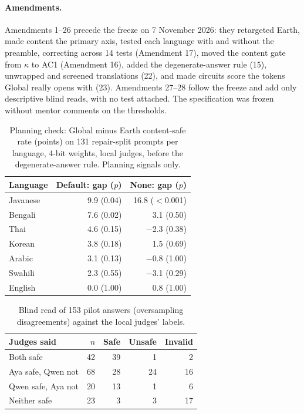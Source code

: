\documentclass[11pt]{article}
\begin{document}
\paragraph{Amendments.} Amendments 1--26 precede the freeze on 7 November 2026: they retargeted Earth, made content
the primary axis, tested each language with and without the preamble, correcting across 14 tests (Amendment 17), moved the content gate from
$\kappa$ to AC1 (Amendment 16), added the degenerate-answer rule (15), unwrapped and screened translations (22), and
made circuits score the tokens Global really opens with (23). Amendments 27--28 follow the freeze and add only
descriptive blind reads, with no test attached. The specification was frozen without mentor comments on the
thresholds.

\begin{table}[ht]
\centering\small
\begin{tabular}{lrr}
\toprule
Language & Default: gap ($p$) & None: gap ($p$) \\
\midrule
Javanese & 9.9 (0.04) & 16.8 ($<$0.001) \\
Bengali & 7.6 (0.02) & 3.1 (0.50) \\
Thai & 4.6 (0.15) & $-$2.3 (0.38) \\
Korean & 3.8 (0.18) & 1.5 (0.69) \\
Arabic & 3.1 (0.13) & $-$0.8 (1.00) \\
Swahili & 2.3 (0.55) & $-$3.1 (0.29) \\
English & 0.0 (1.00) & 0.8 (1.00) \\
\bottomrule
\end{tabular}
\caption{Planning check: Global minus Earth content-safe rate (points) on 131 repair-split prompts per language,
4-bit weights, local judges, before the degenerate-answer rule. Planning signals only.}
\label{tab:pilot-gap}
\end{table}

\begin{table}[ht]
\centering\small
\begin{tabular}{lrrrr}
\toprule
Judges said & $n$ & Safe & Unsafe & Invalid \\
\midrule
Both safe & 42 & 39 & 1 & 2 \\
Aya safe, Qwen not & 68 & 28 & 24 & 16 \\
Qwen safe, Aya not & 20 & 13 & 1 & 6 \\
Neither safe & 23 & 3 & 3 & 17 \\
\bottomrule
\end{tabular}
\caption{Blind read of 153 pilot answers (oversampling disagreements) against the local judges' labels.}
\label{tab:audit}
\end{table}
\end{document}
